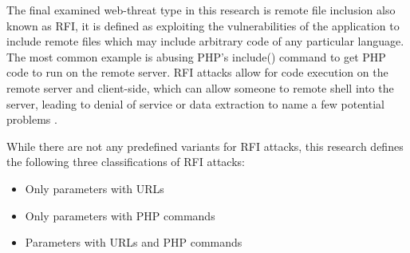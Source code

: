 The final examined web-threat type in this research is remote file inclusion also known as RFI,  it is defined as exploiting the vulnerabilities of the application to include remote files which may include arbitrary code of any particular language.  The most common example is abusing PHP's include() command to get PHP code to run on the remote server.  RFI attacks allow for code execution on the remote server and client-side, which can allow someone to remote shell into the server, leading to denial of service or data extraction to name a few potential problems \cite{owaspRFI}.

While there are not any predefined variants for RFI attacks, this research defines the following three classifications of RFI attacks:
\begin{itemize}
	\item Only parameters with URLs
	\item Only parameters with PHP commands
	\item Parameters with URLs and PHP commands
\end{itemize}
